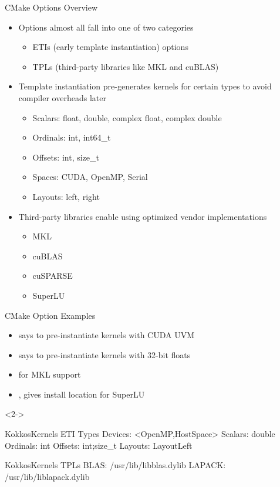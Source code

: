 \begin{frame}[fragile]{CMake Options Overview}
\begin{itemize}
\item Options almost all fall into one of two categories
\begin{itemize}
	\item ETIs (early template instantiation) options
	\item TPLs (third-party libraries like MKL and cuBLAS)
\end{itemize}
\item Template instantiation pre-generates kernels for certain types to avoid compiler overheads later
\begin{itemize}
	\item Scalars: float, double, complex float, complex double
	\item Ordinals: int, int64\_t
	\item Offsets: int, size\_t
	\item Spaces: CUDA, OpenMP, Serial
	\item Layouts: left, right
\end{itemize}
\item Third-party libraries enable using optimized vendor implementations
\begin{itemize}
	\item MKL
	\item cuBLAS
	\item cuSPARSE
	\item SuperLU
\end{itemize}
\end{itemize}
\end{frame}

\begin{frame}[fragile]{CMake Option Examples}
\begin{itemize}
\item {} says to pre-instantiate kernels with CUDA UVM
\item {} says to pre-instantiate kernels with 32-bit floats
\item {} for MKL support
\item {},   gives install location for SuperLU
\end{itemize}

\begin{uncoverenv}<2->
\begin{shell}
KokkosKernels ETI Types
   Devices:  <OpenMP,HostSpace>
   Scalars:  double
   Ordinals: int
   Offsets:  int;size_t
   Layouts:  LayoutLeft

KokkosKernels TPLs
   BLAS:        /usr/lib/libblas.dylib
   LAPACK:      /usr/lib/liblapack.dylib
\end{shell}
\end{uncoverenv}
\end{frame}





